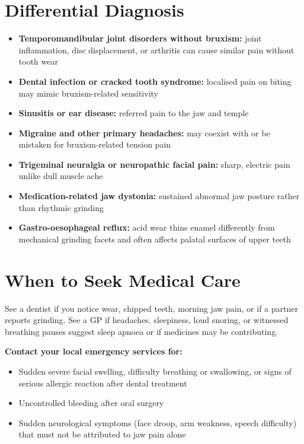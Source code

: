 \section*{Differential Diagnosis}
\begin{itemize}
    \item \textbf{Temporomandibular joint disorders without bruxism:} joint inflammation, disc displacement, or arthritis can cause similar pain without tooth wear
    \item \textbf{Dental infection or cracked tooth syndrome:} localised pain on biting may mimic bruxism-related sensitivity
    \item \textbf{Sinusitis or ear disease:} referred pain to the jaw and temple
    \item \textbf{Migraine and other primary headaches:} may coexist with or be mistaken for bruxism-related tension pain
    \item \textbf{Trigeminal neuralgia or neuropathic facial pain:} sharp, electric pain unlike dull muscle ache
    \item \textbf{Medication-related jaw dystonia:} sustained abnormal jaw posture rather than rhythmic grinding
    \item \textbf{Gastro-oesophageal reflux:} acid wear thins enamel differently from mechanical grinding facets and often affects palatal surfaces of upper teeth
\end{itemize}

\section*{When to Seek Medical Care}
See a dentist if you notice wear, chipped teeth, morning jaw pain, or if a partner reports grinding. See a GP if headaches, sleepiness, loud snoring, or witnessed breathing pauses suggest sleep apnoea or if medicines may be contributing.

\textbf{Contact your local emergency services for:}
\begin{itemize}
    \item Sudden severe facial swelling, difficulty breathing or swallowing, or signs of serious allergic reaction after dental treatment
    \item Uncontrolled bleeding after oral surgery
    \item Sudden neurological symptoms (face droop, arm weakness, speech difficulty) that must not be attributed to jaw pain alone
\end{itemize}

